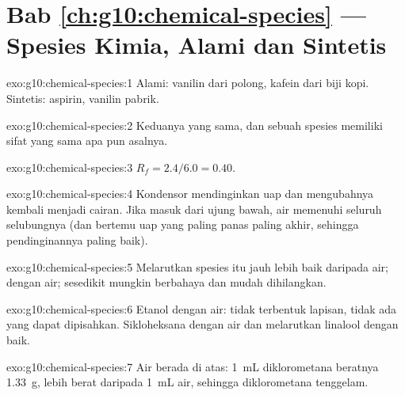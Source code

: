 \section*{Bab \ref{ch:g10:chemical-species} --- Spesies Kimia, Alami dan Sintetis}

\begin{solution}{exo:g10:chemical-species:1}
Alami: vanilin dari polong, kafein dari biji kopi. Sintetis: aspirin,
vanilin pabrik.
\end{solution}

\begin{solution}{exo:g10:chemical-species:2}
Keduanya  yang sama, dan sebuah spesies memiliki sifat yang
sama apa pun asalnya.
\end{solution}

\begin{solution}{exo:g10:chemical-species:3}
$R_f = 2.4/6.0 = 0.40$.
\end{solution}

\begin{solution}{exo:g10:chemical-species:4}
Kondensor mendinginkan uap dan mengubahnya kembali menjadi cairan. Jika
masuk dari ujung bawah, air memenuhi seluruh selubungnya (dan bertemu
uap yang paling panas paling akhir, sehingga pendinginannya paling
baik).
\end{solution}

\begin{solution}{exo:g10:chemical-species:5}
Melarutkan spesies itu jauh lebih baik daripada air;  dengan air; sesedikit mungkin berbahaya dan mudah dihilangkan.
\end{solution}

\begin{solution}{exo:g10:chemical-species:6}
Etanol  dengan air: tidak terbentuk lapisan, tidak ada
yang dapat dipisahkan. Sikloheksana  dengan air dan
melarutkan linalool dengan baik.
\end{solution}

\begin{solution}{exo:g10:chemical-species:7}
Air berada di atas: \qty{1}{mL} diklorometana beratnya \qty{1.33}{g},
lebih berat daripada \qty{1}{mL} air, sehingga diklorometana tenggelam.
\end{solution}


